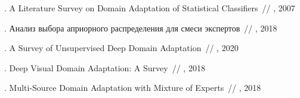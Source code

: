 \documentclass[12pt, twoside]{article}
\begin{document}
\begin{thebibliography}{99}


    .
   A Literature Survey on Domain Adaptation of Statistical Classifiers~//
    , 2007 %
    
    .
   Анализ выбора априорного распределения для смеси экспертов~//
    , 2018 %

    .
   A Survey of Unsupervised Deep Domain Adaptation~//
    , 2020
    
    .
   Deep Visual Domain Adaptation: A Survey~//
    , 2018
    
    .
   Multi-Source Domain Adaptation with Mixture of Experts~//
    , 2018
 
 	
\end{thebibliography}

\end{document}
